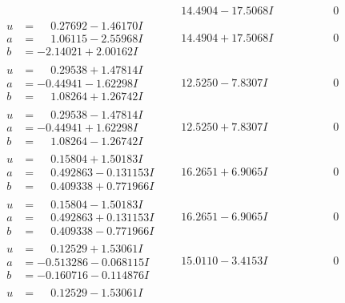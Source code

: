 \documentclass[1p]{elsarticle_modified}
\theoremstyle{definition}
\begin{document}
$$\begin{array}{c|c|c}
 & \phantom{-}14.4904 - 17.5068 I & \phantom{-0.000000 } 0 \\ \hline\begin{aligned}
u &= \phantom{-}0.27692 - 1.46170 I \\
a &= \phantom{-}1.06115 - 2.55968 I \\
b &= -2.14021 + 2.00162 I\end{aligned}
 & \phantom{-}14.4904 + 17.5068 I & \phantom{-0.000000 } 0 \\ \hline\begin{aligned}
u &= \phantom{-}0.29538 + 1.47814 I \\
a &= -0.44941 - 1.62298 I \\
b &= \phantom{-}1.08264 + 1.26742 I\end{aligned}
 & \phantom{-}12.5250 - 7.8307 I & \phantom{-0.000000 } 0 \\ \hline\begin{aligned}
u &= \phantom{-}0.29538 - 1.47814 I \\
a &= -0.44941 + 1.62298 I \\
b &= \phantom{-}1.08264 - 1.26742 I\end{aligned}
 & \phantom{-}12.5250 + 7.8307 I & \phantom{-0.000000 } 0 \\ \hline\begin{aligned}
u &= \phantom{-}0.15804 + 1.50183 I \\
a &= \phantom{-}0.492863 - 0.131153 I \\
b &= \phantom{-}0.409338 + 0.771966 I\end{aligned}
 & \phantom{-}16.2651 + 6.9065 I & \phantom{-0.000000 } 0 \\ \hline\begin{aligned}
u &= \phantom{-}0.15804 - 1.50183 I \\
a &= \phantom{-}0.492863 + 0.131153 I \\
b &= \phantom{-}0.409338 - 0.771966 I\end{aligned}
 & \phantom{-}16.2651 - 6.9065 I & \phantom{-0.000000 } 0 \\ \hline\begin{aligned}
u &= \phantom{-}0.12529 + 1.53061 I \\
a &= -0.513286 - 0.068115 I \\
b &= -0.160716 - 0.114876 I\end{aligned}
 & \phantom{-}15.0110 - 3.4153 I & \phantom{-0.000000 } 0 \\ \hline\begin{aligned}
u &= \phantom{-}0.12529 - 1.53061 I \\

\end{aligned}
\end{array}$$
\end{document}
